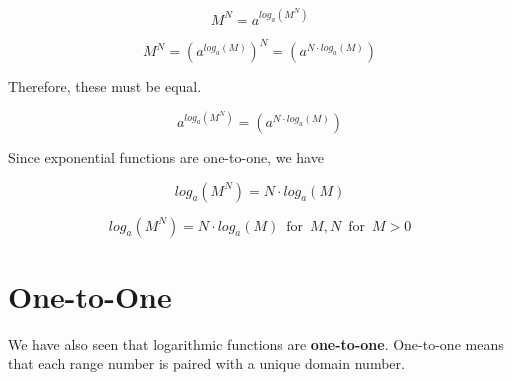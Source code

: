 \documentclass{ximera}
\begin{document}
\[   M^N = a^{log_a(M^N)}                  \]

\[   M^N = (a^{log_a(M)})^N =     (a^{N \cdot log_a(M)})             \]


Therefore, these must be equal.


\[    a^{log_a(M^N)}      =    (a^{N \cdot log_a(M)})                \]





Since exponential functions are one-to-one, we have 


\[    log_a(M^N)    =   N \cdot log_a(M)            \]








\begin{fact} 

\[    log_a(M^N)    =   N \cdot log_a(M)       \, \text{ for } \, M, N  \, \text{ for } \,  M> 0        \]


\end{fact}

















\section{One-to-One}









We have also seen that logarithmic functions are \textbf{one-to-one}. One-to-one means that each range number is paired with a unique domain number.
\end{document}
